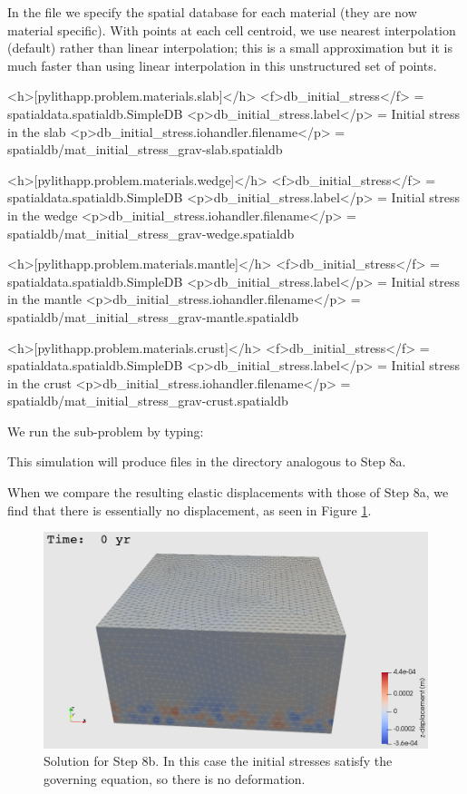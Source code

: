 In the  file we specify the 
spatial database for each material (they are now material
specific). With points at each cell centroid, we use nearest
interpolation (default) rather than linear interpolation; this is a
small approximation but it is much faster than using linear
interpolation in this unstructured set of points.
\begin{cfg}
<h>[pylithapp.problem.materials.slab]</h>
<f>db_initial_stress</f> = spatialdata.spatialdb.SimpleDB
<p>db_initial_stress.label</p> = Initial stress in the slab
<p>db_initial_stress.iohandler.filename</p> = spatialdb/mat_initial_stress_grav-slab.spatialdb

<h>[pylithapp.problem.materials.wedge]</h>
<f>db_initial_stress</f> = spatialdata.spatialdb.SimpleDB
<p>db_initial_stress.label</p> = Initial stress in the wedge
<p>db_initial_stress.iohandler.filename</p> = spatialdb/mat_initial_stress_grav-wedge.spatialdb

<h>[pylithapp.problem.materials.mantle]</h>
<f>db_initial_stress</f> = spatialdata.spatialdb.SimpleDB
<p>db_initial_stress.label</p> = Initial stress in the mantle
<p>db_initial_stress.iohandler.filename</p> = spatialdb/mat_initial_stress_grav-mantle.spatialdb

<h>[pylithapp.problem.materials.crust]</h>
<f>db_initial_stress</f> = spatialdata.spatialdb.SimpleDB
<p>db_initial_stress.label</p> = Initial stress in the crust
<p>db_initial_stress.iohandler.filename</p> =
spatialdb/mat_initial_stress_grav-crust.spatialdb
\end{cfg}

We run the sub-problem by typing:
This simulation will produce files in the  directory
analogous to Step 8a.

When we compare the resulting elastic displacements with those of
Step 8a, we find that there is essentially no displacement,
as seen in Figure \ref{fig:example:subduction:3d:step08b}.

\begin{figure}
  \includegraphics[width=4.5in]{examples/figs/subduction3d_step08b_soln}
  \caption{Solution for Step 8b. In this case the initial stresses
    satisfy the governing equation, so there is no deformation.}
  \label{fig:example:subduction:3d:step08b}
\end{figure}

